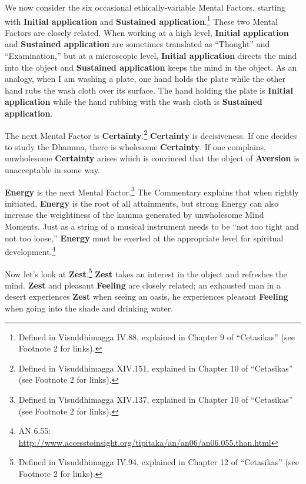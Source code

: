 We now consider the six occasional ethically-variable Mental Factors, starting with \textbf{Initial application} and \textbf{Sustained application}.\footnote{Defined in Visuddhimagga IV.88, explained in Chapter 9 of “Cetasikas” (see Footnote 2 for links).} These two Mental Factors are closely related. When working at a high level, \textbf{Initial application} and \textbf{Sustained application} are sometimes translated as “Thought” and “Examination,” but at a microscopic level, \textbf{Initial application} directs the mind into the object and \textbf{Sustained application} keeps the mind in the object. As an analogy, when I am washing a plate, one hand holds the plate while the other hand rubs the wash cloth over its surface. The hand holding the plate is \textbf{Initial application} while the hand rubbing with the wash cloth is \textbf{Sustained application}.

The next Mental Factor is \textbf{Certainty}.\footnote{Defined in Visuddhimagga XIV.151, explained in Chapter 10 of “Cetasikas” (see Footnote 2 for links).} \textbf{Certainty} is decisiveness. If one decides to study the Dhamma, there is wholesome \textbf{Certainty}. If one complains, unwholesome \textbf{Certainty} arises which is convinced that the object of \textbf{Aversion} is unacceptable in some way.

\pagebreak

\textbf{Energy} is the next Mental Factor.\footnote{Defined in Visuddhimagga XIV.137, explained in Chapter 10 of “Cetasikas” (see Footnote 2 for links).} The Commentary explains that when rightly initiated, \textbf{Energy} is the root of all attainments, but strong Energy can also increase the weightiness of the kamma generated by unwholesome Mind Moments. Just as a string of a musical instrument needs to be “not too tight and not too loose,” \textbf{Energy} must be exerted at the appropriate level for spiritual development.\footnote{AN 6.55: \url{http://www.accesstoinsight.org/tipitaka/an/an06/an06.055.than.html}}

Now let’s look at \textbf{Zest}.\footnote{Defined in Visuddhimagga IV.94, explained in Chapter 12 of “Cetasikas” (see Footnote 2 for links).} \textbf{Zest} takes an interest in the object and refreshes the mind. \textbf{Zest} and pleasant \textbf{Feeling} are closely related; an exhausted man in a desert experiences \textbf{Zest} when seeing an oasis, he experiences pleasant \textbf{Feeling} when going into the shade and drinking water.

